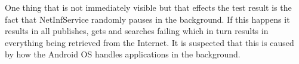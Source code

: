 One thing that is not immediately visible but that effects the test result is the fact that NetInfService randomly pauses in the background. If this happens it results in all publishes, gets and searches failing which in turn results in everything being retrieved from the Internet. It is suspected that this is caused by how the Android OS handles applications in the background.
